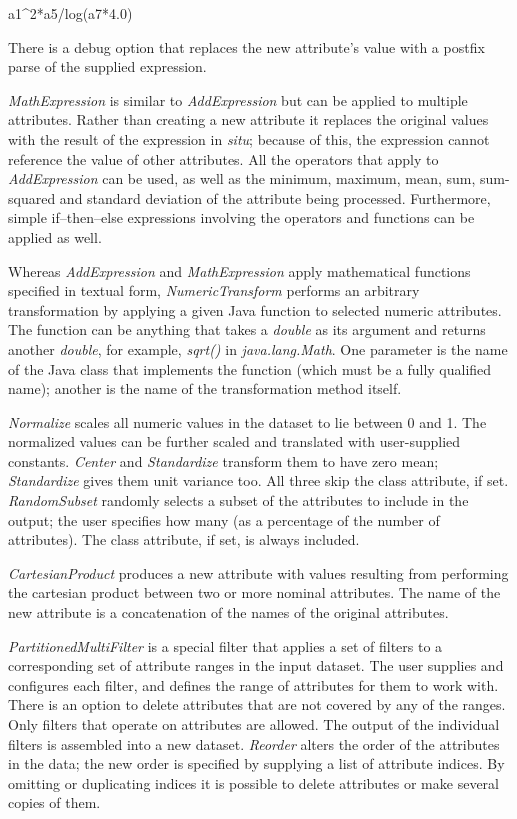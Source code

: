 a1\string^2*a5/log(a7*4.0)\newline

There is a debug option that replaces the new attribute’s value with a
postfix parse of the supplied expression.  

\textit{MathExpression} is similar to \textit{AddExpression} but can
be applied to multiple attributes. Rather than creating a new
attribute it replaces the original values with the result of the
expression in \textit{situ}; because of this, the expression cannot
reference the value of other attributes. All the operators that apply
to \textit{AddExpression} can be used, as well as the minimum,
maximum, mean, sum, sum-squared and standard deviation of the
attribute being processed. Furthermore, simple if–then–else
expressions involving the operators and functions can be applied as
well.

Whereas \textit{AddExpression} and \textit{MathExpression} apply
mathematical functions specified in textual form,
\textit{NumericTransform} performs an arbitrary transformation by
applying a given Java function to selected numeric attributes. The
function can be anything that takes a \textit{double} as its argument
and returns another \textit{double}, for example, \textit{sqrt()} in
\textit{java.lang.Math}. One parameter is the name of the Java class that
implements the function (which must be a fully qualified name);
another is the name of the transformation method itself.

\textit{Normalize} scales all numeric values in the dataset to lie
between 0 and 1. The normalized values can be further scaled and
translated with user-supplied constants. \textit{Center} and
\textit{Standardize} transform them to have zero mean; \textit{Standardize}
gives them unit variance too. All three skip the class attribute, if
set. \textit{RandomSubset} randomly selects a subset of the attributes to
include in the output; the user specifies how many (as a percentage of
the number of attributes). The class attribute, if set, is always
included.

\textit{CartesianProduct} produces a new attribute with values
resulting from performing the cartesian product between two or more
nominal attributes. The name of the new attribute is a concatenation
of the names of the original attributes.

\textit{PartitionedMultiFilter} is a special filter that applies a set
of filters to a corresponding set of attribute ranges in the input
dataset. The user supplies and configures each filter, and defines the
range of attributes for them to work with. There is an option to
delete attributes that are not covered by any of the ranges. Only
filters that operate on attributes are allowed. The output of the
individual filters is assembled into a new dataset. \textit{Reorder}
alters the order of the attributes in the data; the new order is
specified by supplying a list of attribute indices. By omitting or
duplicating indices it is possible to delete attributes or make
several copies of them.

